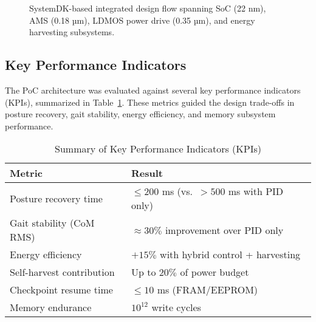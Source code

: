 \begin{figure}[t]
  \centering
  \caption{SystemDK-based integrated design flow spanning SoC (22 nm), AMS (0.18 µm),
  LDMOS power drive (0.35 µm), and energy harvesting subsystems.}
  \label{fig:systemdk_flow}
\end{figure}

\subsection{Key Performance Indicators}
The PoC architecture was evaluated against several key performance indicators (KPIs),
summarized in Table~\ref{tab:kpi_summary}. These metrics guided the design trade-offs
in posture recovery, gait stability, energy efficiency, and memory subsystem performance.

\begin{table}[t]
\caption{Summary of Key Performance Indicators (KPIs)}
\label{tab:kpi_summary}
\centering
\renewcommand{\arraystretch}{1.15}
\footnotesize
\begin{tabular}{@{}p{} p{}@{}}
\toprule
\textbf{Metric} & \textbf{Result} \\
\midrule
Posture recovery time & $\leq 200$ ms (vs.\ $>500$ ms with PID only) \\
Gait stability (CoM RMS) & $\approx 30\%$ improvement over PID only \\
Energy efficiency & $+15\%$ with hybrid control + harvesting \\
Self-harvest contribution & Up to $20\%$ of power budget \\
Checkpoint resume time & $\leq 10$ ms (FRAM/EEPROM) \\
Memory endurance & $10^{12}$ write cycles \\
\bottomrule
\end{tabular}
\end{table}
